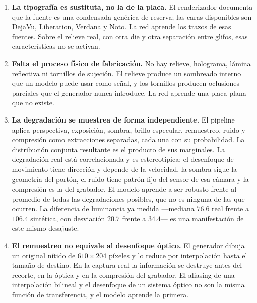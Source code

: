 \begin{enumerate}
    \item \textbf{La tipografía es sustituta, no la de la placa.} El renderizador
        documenta que la fuente es una condensada genérica de reserva; las caras
        disponibles son DejaVu, Liberation, Verdana y Noto. La red aprende los
        trazos de esas fuentes. Sobre el relieve real, con otra die y otra
        separación entre glifos, esas características no se activan.

    \item \textbf{Falta el proceso físico de fabricación.} No hay relieve,
        holograma, lámina reflectiva ni tornillos de sujeción. El relieve produce
        un sombreado interno que un modelo puede usar como señal, y los tornillos
        producen oclusiones parciales que el generador nunca introduce. La red
        aprende una placa plana que no existe.

    \item \textbf{La degradación se muestrea de forma independiente.} El pipeline
        aplica perspectiva, exposición, sombra, brillo especular, remuestreo, ruido
        y compresión como extracciones separadas, cada una con su probabilidad. La
        distribución conjunta resultante es el producto de sus marginales. La
        degradación real está correlacionada y es estereotípica: el desenfoque de
        movimiento tiene dirección y depende de la velocidad, la sombra sigue la
        geometría del portón, el ruido tiene patrón fijo del sensor de esa cámara y
        la compresión es la del grabador. El modelo aprende a ser robusto frente al
        promedio de todas las degradaciones posibles, que no es ninguna de las que
        ocurren. La diferencia de luminancia ya medida ---mediana $76{.}6$ real
        frente a $106{.}4$ sintética, con desviación $20{.}7$ frente a
        $34{.}4$--- es una manifestación de este mismo desajuste.

    \item \textbf{El remuestreo no equivale al desenfoque óptico.} El generador
        dibuja un original nítido de $610 \times 204$ píxeles y lo reduce por
        interpolación hasta el tamaño de destino. En la captura real la información
        se destruye antes del recorte, en la óptica y en la compresión del
        grabador. El aliasing de una interpolación bilineal y el desenfoque de un
        sistema óptico no son la misma función de transferencia, y el modelo
        aprende la primera.
\end{enumerate}

